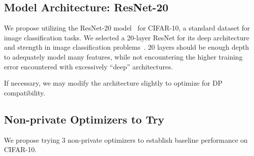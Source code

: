 \subsection{Model Architecture: ResNet-20}\label{subsec:model-architecture:-resnet-20}


We propose utilizing the ResNet-20 model~\cite{Idelbayev_ResNet20} for CIFAR-10,
a standard dataset for image classification tasks.
We selected a 20-layer ResNet for its deep architecture and strength in image classification problems~\cite{DBLP:journals/corr/HeZRS15}.
20
layers should be enough depth to adequately model many features, while not encountering the higher training error encountered
with excessively ``deep'' architectures. \cite{DBLP:journals/corr/HeZRS15}

If necessary, we may modify the architecture slightly to optimize for DP compatibility.

\subsection{Non-private Optimizers to Try}\label{subsec:non-private-optimizers-to-try}
We propose trying 3 non-private optimizers to establish baseline performance on CIFAR-10.

